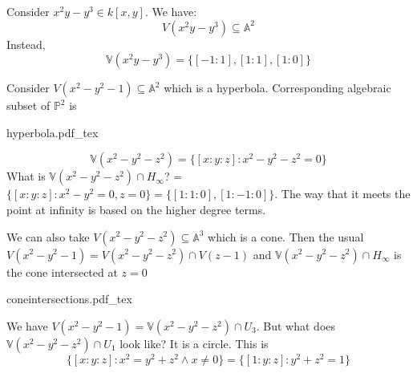 \documentclass{report}
\begin{document}
\begin{examples}
    \begin{example}
        Consider $x^{2}y - y^{3} \in k[x, y]$. We have:
            \begin{equation*}
                V(x^{2}y - y^{3})  \subseteq \mathbb{A}^{2}
            \end{equation*}
        Instead,
            \begin{equation*}
                \mathbb{V}(x^{2}y - y^{3}) = \{[-1 : 1], [1 : 1], [1 : 0]\}
            \end{equation*}
    \end{example}
    \begin{example}
        Consider $V(x^{2} - y^{2} - 1) \subseteq \mathbb{A}^{2}$ which is a hyperbola. Corresponding algebraic subset of $\mathbb{P}^{2}$ is 
            \begin{fixedfigure}
                \centering
                \def\svgwidth{\columnwidth}
                {hyperbola.pdf_tex}
            \end{fixedfigure}
            \begin{equation*}
                \mathbb{V}(x^{2} - y^{2} - z^{2}) = \{[x : y : z] : x^{2} - y^{2} - z^{2} = 0\}
            \end{equation*}
        What is $\mathbb{V}(x^{2} - y^{2} - z^{2}) \cap H_{\infty}$? = $\{[x : y : z] : x^{2} - y^{2} = 0, z = 0\} = \{[1 : 1 : 0], [1: - 1 : 0]\}$. The way that it meets the point at infinity is based on the higher degree terms.

        We can also take $V(x^{2} - y^{2} - z^{2}) \subseteq \mathbb{A}^{3}$ which is a cone. Then the usual $V(x^{2} - y^{2} - 1) = V(x^{2} - y^{2} - z^{2}) \cap V(z - 1)$ and $\mathbb{V}(x^{2} - y^{2} - z^{2}) \cap H_{\infty}$ is the cone intersected at $z = 0$
            \begin{fixedfigure}
                \centering
                \def\svgwidth{\columnwidth}
                {coneintersections.pdf_tex}
            \end{fixedfigure}

        We have $V(x^{2} - y^{2} - 1) = \mathbb{V}(x^{2} - y^{2} - z^{2}) \cap U_{3}$. But what does $\mathbb{V}(x^{2} - y^{2} -z^{2}) \cap U_{1}$ look like? It is a circle. This is
            \begin{equation*}
                \{[x : y : z] : x^{2} = y^{2} + z^{2} \land x \neq 0\} = \{[1 : y : z] : y^{2} + z^{2} = 1\}
            \end{equation*}
    \end{example}
\end{examples}
\end{document}

